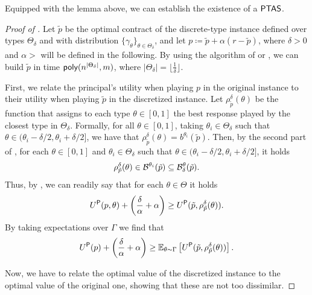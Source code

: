 Equipped with the lemma above, we can establish the existence of a $\textsf{PTAS}$.


\begin{proof}[Proof of ]
    Let $\tilde p$ be the optimal contract of the discrete-type instance defined over types $\Theta_\delta$ and with distribution $\{\gamma_\theta\}_{\theta \in \Theta_\delta}$, and let $p\coloneqq \tilde p+\alpha(r-\tilde p)$, where $\delta>0$ and $\alpha>$ will be defined in the following.
    By using the algorithm of \citet[Theorem~8]{castiglioni2022bayesian} or \citet[Lemma~2]{guruganesh2021contracts}, we can build $\tilde p$ in time $\textsf{poly}(n^{|\Theta_\delta|}, m)$, where $|\Theta_\delta|=\lfloor\frac{1}{\delta}\rfloor$.

    First, we relate the principal's utility when playing $p$ in the original instance to their utility when playing $\tilde p$ in the discretized instance.
    Let $\rho_{\tilde p}^\delta(\theta)$ be the function that assigns to each type $\theta\in [0,1]$ the best response played by the closest type in $\Theta_\delta$. Formally, for all $\theta\in[0,1]$, taking  $\theta_i\in \Theta_\delta$ such that $\theta \in(\theta_i-\delta/2,\theta_i+\delta/2]$, we have that $\rho_{\tilde p}^\delta(\theta) = b^{\theta_i}(\tilde p)$.
%
    Then, by the second part of , for each $\theta \in [0,1]$ and  $\theta_i \in \Theta_\delta$  such that $\theta \in(\theta_i-\delta/2,\theta_i+\delta/2]$, it holds
    \[ \rho_{\tilde p}^\delta(\theta)\in \mathcal{B}^{\theta_i}(\tilde p) \subseteq \mathcal{B}_{\delta}^{\theta}(\tilde p).   \]
    Thus, by , we can readily say that for each $\theta\in\Theta$ it holds
	\begin{align*}
	U^\textsf{P}(p,\theta)+\left(\frac{\delta}{\alpha}+\alpha\right)\ge U^\textsf{P}(\tilde p, \rho^\delta_{\tilde p}(\theta)).
	\end{align*}
%
	By taking expectations over $\Gamma$ we find that
	\begin{align}\label{eq:ptastmp1}
	U^\textsf{P}(p)+\left(\frac{\delta}{\alpha}+\alpha\right)\ge \mathbb{E}_{\theta\sim\Gamma} \left[U^\textsf{P}(\tilde p, \rho^\delta_{\tilde p}(\theta))\right].
	\end{align}

    Now, we have to relate the optimal value of the discretized instance to the optimal value of the original one, showing that these are not too dissimilar.
    

\end{proof}
